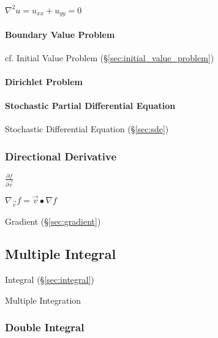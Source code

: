 $\nabla^2 u = u_{xx} + u_{yy} = 0$ %



\paragraph{Boundary Value Problem}\label{sec:boundary_value_problem}\hfill

\fist cf. Initial Value Problem (\S\ref{sec:initial_value_problem})



\paragraph{Dirichlet Problem}\label{sec:dirichlet_problem}\hfill

\paragraph{Stochastic Partial Differential Equation}\label{sec:spde}\hfill

\fist Stochastic Differential Equation (\S\ref{sec:sde})



\subsubsection{Directional Derivative}\label{sec:directional_derivative}

$\frac{\partial{f}}{\partial{\vec{v}}}$

$\nabla_{\vec{v}} f = \vec{v}\bullet \nabla{f}$

Gradient (\S\ref{sec:gradient})



\subsection{Multiple Integral}\label{sec:multiple_integral}

Integral (\S\ref{sec:integral})

Multiple Integration



\subsubsection{Double Integral}\label{sec:double_integral}

